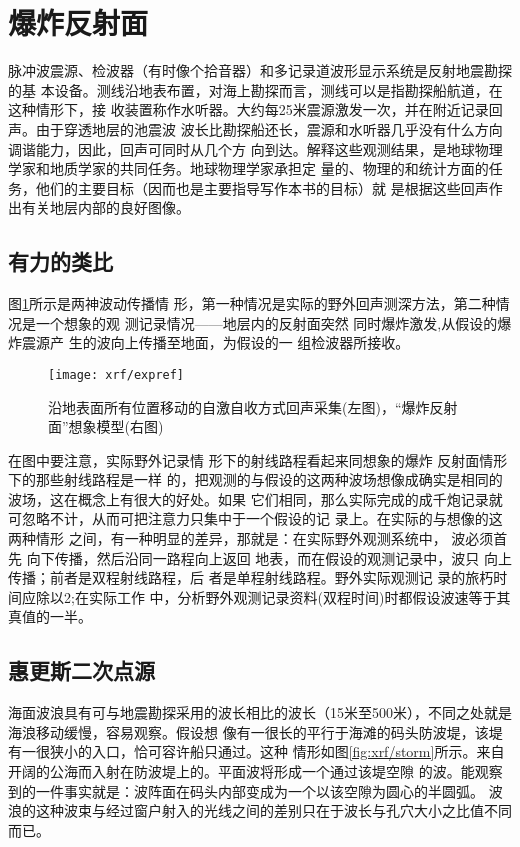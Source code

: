 \section{爆炸反射面}
脉冲波震源、检波器（有时像个拾音器）和多记录道波形显示系统是反射地震勘探的基
本设备。测线沿地表布置，对海上勘探而言，测线可以是指勘探船航道，在这种情形下，接
收装置称作水听器。大约每25米震源激发一次，并在附近记录回声。由于穿透地层的池震波
波长比勘探船还长，震源和水听器几乎没有什么方向调谐能力，因此，回声可同时从几个方
向到达。解释这些观测结果，是地球物理学家和地质学家的共同任务。地球物理学家承担定
量的、物理的和统计方面的任务，他们的主要目标（因而也是主要指导写作本书的目标）就
是根据这些回声作出有关地层内部的良好图像。

\subsection{有力的类比}

图\ref{fig:xrf/expref}所示是两神波动传播情
形，第一种情况是实际的野外回声测深方法，第二种情况是一个想象的观
测记录情况------地层内的反射面突然
同时爆炸激发,从假设的爆炸震源产 生的波向上传播至地面，为假设的一
组检波器所接收。

\begin{figure}[H]
\centering
\texttt{[image: xrf/expref]}
\caption[爆炸反射面]{沿地表面所有位置移动的自激自收方式回声采集(左图)，“爆炸反射面”想象模型(右图)}
\label{fig:xrf/expref}
\end{figure}
在图中要注意，实际野外记录情
形下的射线路程看起来同想象的爆炸 反射面情形下的那些射线路程是一样
的，把观测的与假设的这两种波场想像成确实是相同的波场，这在概念上有很大的好处。如果
它们相同，那么实际完成的成千炮记录就可忽略不计，从而可把注意力只集中于一个假设的记
录上。在实际的与想像的这两种情形 之间，有一种明显的差异，那就是：在实际野外观测系统中，
波必须首先 向下传播，然后沿同一路程向上返回
地表，而在假设的观测记录中，波只 向上传播；前者是双程射线路程，后
者是单程射线路程。野外实际观测记 录的旅朽时间应除以2;在实际工作
中，分析野外观测记录资料(双程时间)时都假设波速等于其真值的一半。

\subsection{惠更斯二次点源}
海面波浪具有可与地震勘探采用的波长相比的波长（15米至500米），不同之处就是海浪移动缓慢，容易观察。假设想
像有一很长的平行于海滩的码头防波堤，该堤有一很狭小的入口，恰可容许船只通过。这种
情形如图\ref{fig:xrf/storm}所示。来自开阔的公海而入射在防波堤上的。平面波将形成一个通过该堤空隙
的波。能观察到的一件事实就是：波阵面在码头内部变成为一个以该空隙为圆心的半圆弧。
波浪的这种波束与经过窗户射入的光线之间的差别只在于波长与孔穴大小之比值不同而已。

